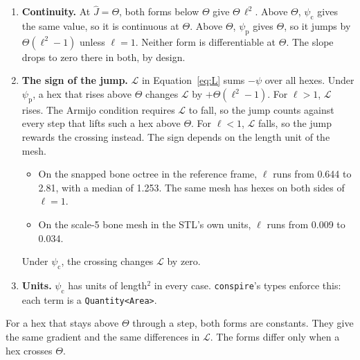 \documentclass[11pt]{article}
\newcommand{\Jh}{\hat{J}}
\begin{document}
\begin{enumerate}[leftmargin=*]
  \item \textbf{Continuity.}
    At $\Jh = \Theta$, both forms below $\Theta$ give $\Theta \, \ell^2$.
    Above $\Theta$, $\psi_{\mathrm{c}}$ gives the same value, so it is continuous at $\Theta$.
    Above $\Theta$, $\psi_{\mathrm{p}}$ gives $\Theta$, so it jumps by $\Theta (\ell^2 - 1)$ unless $\ell = 1$.
    Neither form is differentiable at $\Theta$.
    The slope drops to zero there in both, by design.

  \item \textbf{The sign of the jump.}
    $\mathcal{L}$ in Equation~\eqref{eq:L} sums $-\psi$ over all hexes.
    Under $\psi_{\mathrm{p}}$, a hex that rises above $\Theta$ changes $\mathcal{L}$ by $+\Theta (\ell^2 - 1)$.
    For $\ell > 1$, $\mathcal{L}$ rises.
    The Armijo condition requires $\mathcal{L}$ to fall, so the jump counts against every step that lifts such a hex above $\Theta$.
    For $\ell < 1$, $\mathcal{L}$ falls, so the jump rewards the crossing instead.
    The sign depends on the length unit of the mesh.
    \begin{itemize}
      \item On the snapped bone octree in the reference frame, $\ell$ runs from 0.644 to 2.81, with a median of 1.253.
        The same mesh has hexes on both sides of $\ell = 1$.
      \item On the scale-5 bone mesh in the STL's own units, $\ell$ runs from 0.009 to 0.034.
    \end{itemize}
    Under $\psi_{\mathrm{c}}$, the crossing changes $\mathcal{L}$ by zero.

  \item \textbf{Units.}
    $\psi_{\mathrm{c}}$ has units of length$^2$ in every case.
    \texttt{conspire}'s types enforce this: each term is a \texttt{Quantity<Area>}.
\end{enumerate}

For a hex that stays above $\Theta$ through a step, both forms are constants.
They give the same gradient and the same differences in $\mathcal{L}$.
The forms differ only when a hex crosses $\Theta$.
\end{document}
